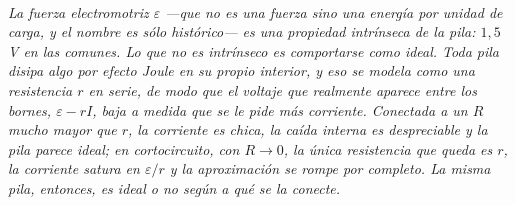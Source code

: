 \begin{center}
\begin{tikzpicture}[scale=0.95]
\end{tikzpicture}\\[0.5em]
{\small\itshape La fuerza electromotriz $\varepsilon$ ---que no es una fuerza
sino una energía por unidad de carga, y el nombre es sólo histórico--- es una
propiedad intrínseca de la pila: $1{,}5$ V en las comunes. Lo que \emph{no} es
intrínseco es comportarse como ideal. Toda pila disipa algo por efecto Joule en
su propio interior, y eso se modela como una resistencia $r$ en serie, de modo
que el voltaje que realmente aparece entre los bornes, $\varepsilon - rI$, baja
a medida que se le pide más corriente. Conectada a un $R$ mucho mayor que $r$,
la corriente es chica, la caída interna es despreciable y la pila parece ideal;
en cortocircuito, con $R \to 0$, la única resistencia que queda es $r$, la
corriente satura en $\varepsilon/r$ y la aproximación se rompe por completo. La
misma pila, entonces, es ideal o no según a qué se la conecte.}
\end{center}

